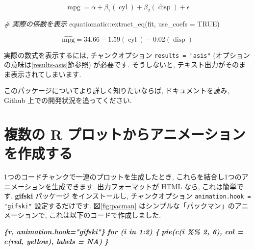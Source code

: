 \documentclass[
  11pt,
]{bxjsreport}
\newenvironment{Shaded}{\begin{snugshade}}{\end{snugshade}}
\newcommand{\AttributeTok}[1]{\textcolor[rgb]{0.77,0.63,0.00}{#1}}
\newcommand{\CommentTok}[1]{\textcolor[rgb]{0.56,0.35,0.01}{\textit{#1}}}
\newcommand{\ConstantTok}[1]{\textcolor[rgb]{0.00,0.00,0.00}{#1}}
\newcommand{\FunctionTok}[1]{\textcolor[rgb]{0.00,0.00,0.00}{#1}}
\newcommand{\InformationTok}[1]{\textcolor[rgb]{0.56,0.35,0.01}{\textbf{\textit{#1}}}}
\newcommand{\NormalTok}[1]{#1}
\newcommand{\SpecialCharTok}[1]{\textcolor[rgb]{0.00,0.00,0.00}{#1}}
\begin{document}
\[
\operatorname{mpg} = \alpha + \beta_{1}(\operatorname{cyl}) + \beta_{2}(\operatorname{disp}) + \epsilon
\]

\begin{Shaded}
\begin{Highlighting}[numbers=left,,]
\CommentTok{\# 実際の係数を表示}
\NormalTok{equatiomatic}\SpecialCharTok{::}\FunctionTok{extract\_eq}\NormalTok{(fit, }\AttributeTok{use\_coefs =} \ConstantTok{TRUE}\NormalTok{)}
\end{Highlighting}
\end{Shaded}

\[
\operatorname{\widehat{mpg}} = 34.66 - 1.59(\operatorname{cyl}) - 0.02(\operatorname{disp})
\]

実際の数式を表示するには, チャンクオプション \texttt{results = "asis"} (オプションの意味は\ref{results-asis}節参照) が必要です. そうしないと, テキスト出力がそのまま表示されてしまいます.

このパッケージについてより詳しく知りたいならば, ドキュメントを読み, Github 上での開発状況を追ってください.

\hypertarget{animation}{%
\section{複数の R プロットからアニメーションを作成する}\label{animation}}

1つのコードチャンクで一連のプロットを生成したとき, これらを結合し1つのアニメーションを生成できます. 出力フォーマットが HTML なら, これは簡単です. \textbf{gifski} パッケージ \autocite{R-gifski} をインストールし, チャンクオプション \texttt{animation.hook = "gifski"} 設定するだけです. 図\ref{fig:pacman} はシンプルな「パックマン」のアニメーションで, これは以下のコードで作成しました.

\begin{Shaded}
\begin{Highlighting}[]
\InformationTok{\textasciigrave{}\textasciigrave{}\textasciigrave{}\{r, animation.hook="gifski"\}}
\InformationTok{for (i in 1:2) \{}
\InformationTok{  pie(c(i \%\% 2, 6), col = c(\textquotesingle{}red\textquotesingle{}, \textquotesingle{}yellow\textquotesingle{}), labels = NA)}
\InformationTok{\}}
\InformationTok{\textasciigrave{}\textasciigrave{}\textasciigrave{}}
\end{Highlighting}
\end{Shaded}
\end{document}
